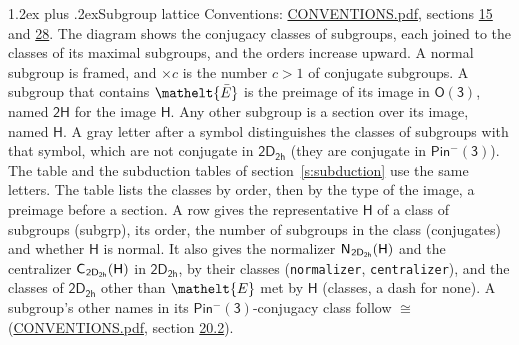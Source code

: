 \documentclass[10pt,a4paper]{article}
\makeatletter
\renewcommand\section{\@startsection{section}{1}{\z@}{-3ex plus -1ex minus -.2ex}%
  {1.2ex plus .2ex}{\normalfont\large\sffamily\bfseries\color{parttitle}}}
\numberwithin{equation}{section}
\newcommand{\eltfont}[1]{{\let\sigma\eltsigma\mathelt{#1}}}
\newcommand{\grp}[1]{\mathsf{#1}}
\newcommand{\cls}[1]{\eltfont{#1}}
\newcommand{\elt}[1]{\eltfont{#1}}
\newcommand{\samecls}{\cong}
\newcommand{\barred}[1]{\bar{#1}}
\newcommand{\hairsp}{\mkern1mu}
\makeatother
\begin{document}
\section{Subgroup lattice}\label{s:subgroups}
Conventions: \href{../../CONVENTIONS.pdf}{CONVENTIONS.pdf}, sections \href{../../../rotation/CONVENTIONS.pdf\#conv.15}{15} and \href{../../CONVENTIONS.pdf\#conv.28}{28}.
The diagram shows the conjugacy classes of subgroups, each joined to the classes of its maximal subgroups, and the orders increase upward. \label{n:index.conjugates.c}A normal subgroup is framed, and ${\times}c$ is the number $c > 1$ of conjugate subgroups. \label{n:group.H}A subgroup that contains $\elt{\barred{E}}$ is the preimage of its image in $\grp{O(3)}$, named $\grp{2H}$ for the image $\grp{H}$. Any other subgroup is a section over its image, named $\grp{H}$. A gray letter after a symbol distinguishes the classes of subgroups with that symbol, which are not conjugate in $\grp{2D_{2h}}$ (they are conjugate in \href{Pinminus3.pdf}{$\grp{Pin^{-}(3)}$}). The table and the subduction tables of section~\ref{s:subduction} use the same letters. The table lists the classes by order, then by the type of the image, a preimage before a section. \label{n:head.subgroup}\label{n:head.order}\label{n:head.conjugates}\label{n:head.normal}A row gives the representative $\grp{H}$ of a class of subgroups (subgrp), its order, the number of subgroups in the class (conjugates) and whether $\grp{H}$ is normal. \label{n:group.normalizer}\label{n:group.centralizer}\label{n:head.classes}It also gives the normalizer $\grp{N}_{\hairsp \grp{2D_{2h}}}(\grp{H})$ and the centralizer $\grp{C}_{\hairsp \grp{2D_{2h}}}(\grp{H})$ in $\grp{2D_{2h}}$, by their classes (\texttt{normalizer}, \texttt{centralizer}), and the classes of $\grp{2D_{2h}}$ other than $\cls{E}$ met by $\grp{H}$ (classes, a dash for none). A subgroup's other names in its \href{Pinminus3.pdf}{$\grp{Pin^{-}(3)}$}-conjugacy class follow $\samecls$ (\href{../../CONVENTIONS.pdf}{CONVENTIONS.pdf}, section \href{../../CONVENTIONS.pdf\#conv.20.2}{20.2}).
\end{document}
